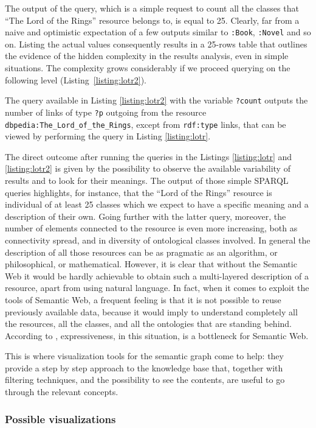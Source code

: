 The output of the query, which is a simple request to count all the classes that ``The Lord of the Rings'' resource belongs to, is equal to 25. Clearly, far from a naive and optimistic expectation of a few outputs similar to \texttt{:Book}, \texttt{:Novel} and so on. Listing the actual values consequently results in a 25-rows table that outlines the evidence of the hidden complexity in the results analysis, even in simple situations. The complexity grows considerably if we proceed querying on the following level (Listing~\ref{listing:lotr2}).

The query available in Listing \ref{listing:lotr2} with the variable \texttt{?count} outputs the number of links of type \texttt{?p} outgoing from the resource \texttt{dbpedia:The\_Lord\_of\_the\_Rings}, except from \texttt{rdf:type} links, that can be viewed by performing the query in Listing \ref{listing:lotr}.

The direct outcome after running the queries in the Listings \ref{listing:lotr} and \ref{listing:lotr2} is given by the possibility to observe the available variability of results and to look for their meanings. The output of those simple SPARQL queries highlights, for instance, that the ``Lord of the Rings'' resource is individual of at least 25 classes which we expect to have a specific meaning and a description of their own. Going further with the latter query, moreover, the number of elements connected to the resource is even more increasing, both as connectivity spread, and in diversity of ontological classes involved. In general the description of all those resources can be as pragmatic as an algorithm, or philosophical, or mathematical. However, it is clear that without the Semantic Web it would be hardly achievable to obtain such a multi-layered description of a resource, apart from using natural language. In fact, when it comes to exploit the tools of Semantic Web, a frequent feeling is that it is not possible to reuse previously available data, because it would imply to understand completely all the resources, all the classes, and all the ontologies that are standing behind. According to \cite{920602}, expressiveness, in this situation, is a bottleneck for Semantic Web.

This is where visualization tools for the semantic graph come to help: they provide a step by step approach to the knowledge base that, together with filtering techniques, and the possibility to see the contents, are useful to go through the relevant concepts.

\subsubsection{\textsf{Possible visualizations}}

